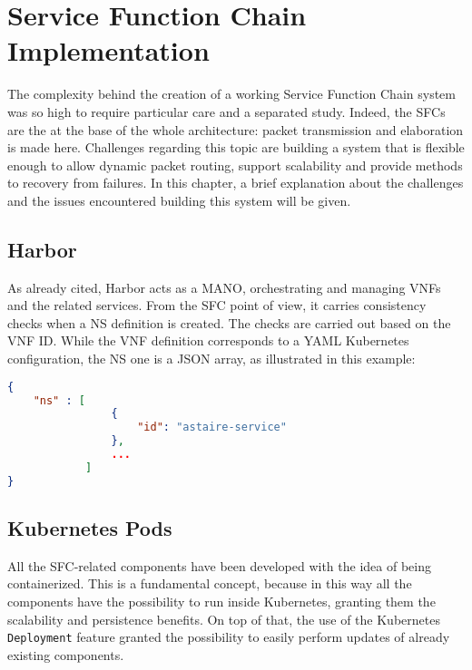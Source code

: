 \chapter{Service Function Chain Implementation} 
\label{chap:vnf_ns_impl}

The complexity behind the creation of a working Service Function Chain system
was so high to require particular care and a separated study. Indeed, the SFCs
are the at the base of the whole architecture: packet transmission and
elaboration is made here. Challenges regarding this topic are building a system
that is flexible enough to allow dynamic packet routing, support scalability and
provide methods to recovery from failures. In this chapter, a brief explanation
about the challenges and the issues encountered building this system will be
given.

\section{Harbor}

As already cited, Harbor acts as a MANO, orchestrating and managing VNFs and the
related services. From the SFC point of view, it carries consistency checks when
a NS definition is created. The checks are carried out based on the VNF ID.
While the VNF definition corresponds to a YAML Kubernetes configuration, the NS
one is a JSON array, as illustrated in this example:

\begin{lstlisting}[caption={Example of SFC definition}, captionpos=b,
                   language=json, label=chap:impl:lst:sfcexample]
{
    "ns" : [
                {
                    "id": "astaire-service"
                },
                ...
            ]
}
\end{lstlisting}



\section{Kubernetes Pods}

All the SFC-related components have been developed with the idea of being
containerized. This is a fundamental concept, because in this way all the
components have the possibility to run inside Kubernetes, granting them the
scalability and persistence benefits. On top of that, the use of the Kubernetes
\verb!Deployment! feature granted the possibility to easily perform updates of
already existing components.

